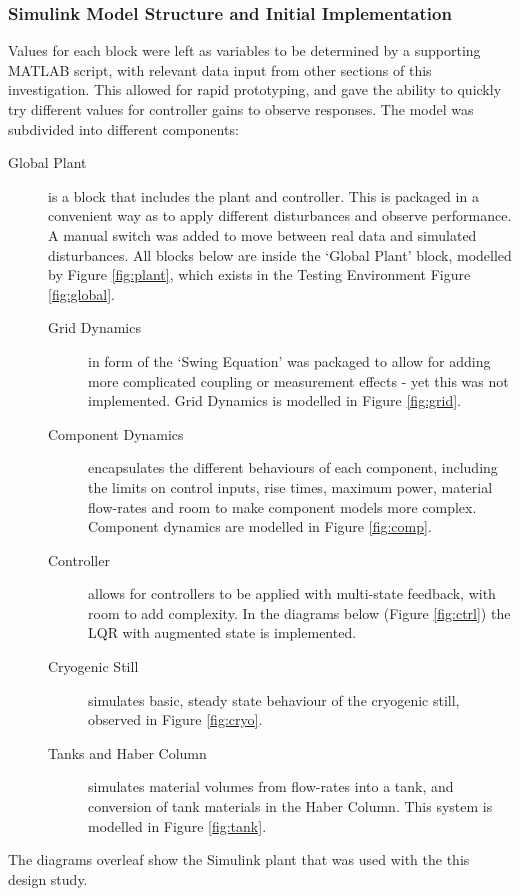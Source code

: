 \subsubsection{Simulink Model Structure and Initial Implementation}

Values for each block were left as variables to be determined by a supporting MATLAB script, with relevant data input from other sections of this investigation.
This allowed for rapid prototyping, and gave the ability to quickly try different values for controller gains to observe responses.
The model was subdivided into different components:
\begin{description}
\item[Global Plant]{ is a block that includes the plant and controller.
This is packaged in a convenient way as to apply different disturbances and observe performance.
A manual switch was added to move between real data and simulated disturbances.
All blocks below are inside the `Global Plant' block, modelled by Figure \ref{fig:plant}, which exists in the Testing Environment Figure \ref{fig:global}.}
\begin{description}
        \item[Grid Dynamics]{ in form of the `Swing Equation' was packaged to allow for adding more complicated coupling or measurement effects - yet this was not implemented. Grid Dynamics is modelled in Figure \ref{fig:grid}.}
        \item[Component Dynamics]{ encapsulates the different behaviours of each component, including the limits on control inputs, rise times, maximum power, material flow-rates and room to make component models more complex. Component dynamics are modelled in Figure \ref{fig:comp}.}
        \item[Controller]{ allows for controllers to be applied with multi-state feedback, with room to add complexity. In the diagrams below (Figure \ref{fig:ctrl}) the LQR with augmented state is implemented.}
        \item[Cryogenic Still]{ simulates basic, steady state behaviour of the cryogenic still, observed in Figure \ref{fig:cryo}.}
        \item[Tanks and Haber Column]{ simulates material volumes from flow-rates into a tank, and conversion of tank materials in the Haber Column. This system is modelled in Figure \ref{fig:tank}.}
\end{description}
\end{description}
The diagrams overleaf show the Simulink plant that was used with the this design study.

